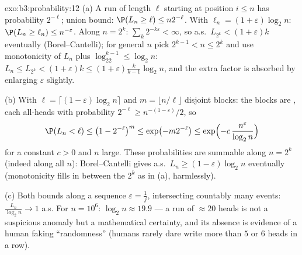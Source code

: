 \begin{solution}{exo:b3:probability:12}
(a) A run of length $\ell$ starting at position $i \leq n$
has probability $2^{-\ell}$; union bound: $\P(L_n \geq \ell)
\leq n2^{-\ell}$. With $\ell_n = (1 +
\varepsilon)\log_2n$: $\P(L_n \geq \ell_n) \leq
n^{-\varepsilon}$. Along $n = 2^k$:
$\sum_k2^{-k\varepsilon} < \infty$, so a.s.\ $L_{2^k} <
(1+\varepsilon)k$ eventually (Borel--Cantelli); for general
$n$ pick $2^{k-1} < n \leq 2^k$ and use monotonicity of
$L_n$ plus $\log_22^{k-1} \leq \log_2n$: $L_n \leq L_{2^k}
< (1 + \varepsilon)k \leq (1 + \varepsilon)\frac{k}{k-1}
\log_2n$, and the extra factor is absorbed by enlarging
$\varepsilon$ slightly.

(b) With $\ell = \lceil(1 - \varepsilon)\log_2n\rceil$ and
$m = \lfloor n/\ell\rfloor$ disjoint blocks: the blocks are
, each all-heads with probability $2^{-\ell}
\geq n^{-(1-\varepsilon)}/2$, so
\[
\P(L_n < \ell) \leq \bigl(1 - 2^{-\ell}\bigr)^{m}
\leq \exp\bigl(-m2^{-\ell}\bigr)
\leq \exp\Bigl(-c\,\frac{n^{\varepsilon}}{\log_2n}\Bigr)
\]
for a constant $c > 0$ and $n$ large. These probabilities
are summable along $n = 2^k$ (indeed along all $n$):
Borel--Cantelli gives a.s.\ $L_n \geq (1 -
\varepsilon)\log_2n$ eventually (monotonicity fills in
between the $2^k$ as in (a), harmlessly).

(c) Both bounds along a sequence $\varepsilon = \frac1j$,
intersecting countably many  events:
$\frac{L_n}{\log_2n} \to 1$ a.s. For $n = 10^6$: $\log_2n
\approx 19.9$ --- a run of $\approx 20$ heads is not a
suspicious anomaly but a mathematical certainty, and its
absence is evidence of a human faking ``randomness'' (humans
rarely dare write more than $5$ or $6$ heads in a row).
\end{solution}

